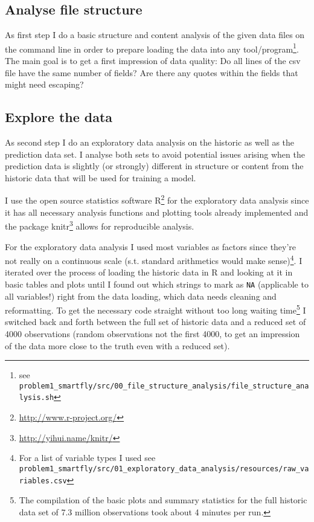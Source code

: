 \documentclass{article}
\begin{document}
\subsection{Analyse file structure} %
\label{sub:analyse_file_structure}
As first step I do a basic structure and content analysis of the given data files on the command line in order to prepare loading the data into any tool/program\footnote{see \verb+problem1_smartfly/src/00_file_structure_analysis/file_structure_analysis.sh+ }. The main goal is to get a first impression of data quality: Do all lines of the csv file have the same number of fields? Are there any quotes within the fields that might need escaping?




\subsection{Explore the data} %
\label{sub:explore_data}

As second step I do an exploratory data analysis on the historic as well as the prediction data set. I analyse both sets to avoid potential issues arising when the prediction data is slightly (or strongly) different in structure or content from the historic data that will be used for training a model. 

I use the open source statistics software R\footnote{\url{http://www.r-project.org/}} for the exploratory data analysis since it has all necessary analysis functions and plotting tools already implemented and the package knitr\footnote{\url{http://yihui.name/knitr/}} allows for reproducible analysis.

For the exploratory data analysis I used most variables as factors since they're not really on a continuous scale (s.t. standard arithmetics would make sense)\footnote{For a list of variable types I used see \verb+problem1_smartfly/src/01_exploratory_data_analysis/resources/raw_variables.csv+}.
I iterated over the process of loading the historic data in R and looking at it in basic tables and plots until I found out which strings to mark as \verb+NA+ (applicable to all variables!) right from the data loading, which data needs cleaning and reformatting. To get the necessary code straight without too long waiting time\footnote{The compilation of the basic plots and summary statistics for the full historic data set of 7.3 million observations took about 4 minutes per run.} I switched back and forth between the full set of historic data and a reduced set of 4000 observations (random observations not the first 4000, to get an impression of the data more close to the truth even with a reduced set).
\end{document}
